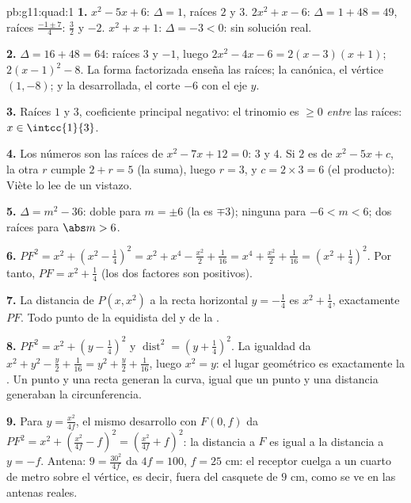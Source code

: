 \begin{solution}{pb:g11:quad:1}
\textbf{1.} $x^2 - 5x + 6$: $\Delta = 1$, raíces $2$ y $3$.
$2x^2 + x - 6$: $\Delta = 1 + 48 = 49$, raíces $\frac{-1 \pm 7}{4}$:
$\frac32$ y $-2$. $x^2 + x + 1$: $\Delta = -3 < 0$: sin solución real.

\textbf{2.} $\Delta = 16 + 48 = 64$: raíces $3$ y $-1$, luego
$2x^2 - 4x - 6 = 2(x - 3)(x + 1)$;  $2(x - 1)^2 - 8$. La
forma factorizada enseña las raíces; la canónica, el vértice $(1, -8)$; y
la desarrollada, el corte $-6$ con el eje $y$.

\textbf{3.} Raíces $1$ y $3$, coeficiente principal negativo: el trinomio
es $\geq 0$ \emph{entre} las raíces: $x \in \intcc{1}{3}$.

\textbf{4.} Los números son las raíces de $x^2 - 7x + 12 = 0$: $3$ y $4$.
Si $2$ es  de $x^2 - 5x + c$, la otra  $r$ cumple $2 + r = 5$ (la
suma), luego $r = 3$, y $c = 2 \times 3 = 6$ (el producto): Viète lo lee
de un vistazo.

\textbf{5.} $\Delta = m^2 - 36$:  doble para $m = \pm 6$ (la  es
$\mp 3$); ninguna  para $-6 < m < 6$; dos raíces para $\abs m > 6$.

\textbf{6.} $PF^2 = x^2 + \left(x^2 - \frac14\right)^2
= x^2 + x^4 - \frac{x^2}{2} + \frac{1}{16}
= x^4 + \frac{x^2}{2} + \frac{1}{16}
= \left(x^2 + \frac14\right)^2$. Por tanto,
$PF = x^2 + \frac14$ (los dos factores son positivos).

\textbf{7.} La distancia de $P(x, x^2)$ a la recta horizontal
$y = -\frac14$ es $x^2 + \frac14$, exactamente $PF$. Todo punto de la
 equidista del  y de la .

\textbf{8.} $PF^2 = x^2 + \left(y - \frac14\right)^2$ y
$\operatorname{dist}^2 = \left(y + \frac14\right)^2$. La igualdad da
$x^2 + y^2 - \frac y2 + \frac{1}{16} = y^2 + \frac y2 + \frac1{16}$, luego
$x^2 = y$: el lugar geométrico es exactamente la . Un punto y una
recta generan la curva, igual que un punto y una distancia generaban la
circunferencia.

\textbf{9.} Para $y = \frac{x^2}{4f}$, el mismo desarrollo con $F(0, f)$
da $PF^2 = x^2 + \left(\frac{x^2}{4f} - f\right)^2
= \left(\frac{x^2}{4f} + f\right)^2$: la distancia a $F$ es igual a la
distancia a $y = -f$. Antena: $9 = \frac{30^2}{4f}$ da $4f = 100$,
$f = 25$ cm: el receptor cuelga a un cuarto de metro sobre el vértice, es
decir, fuera del casquete de $9$ cm, como se ve en las antenas reales.


\end{solution}
